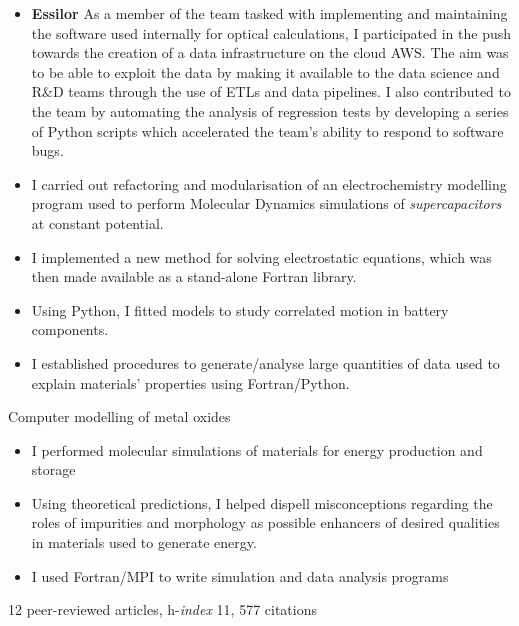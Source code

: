 \documentclass[10pt,a4paper,ragged2e,academicons]{altacv}
\begin{document}
\divider

\begin{itemize}
\item \textbf{Essilor} As a member of the team tasked with implementing and maintaining the software used internally for optical calculations, I participated in the push towards the creation of a data infrastructure on the cloud AWS. The aim was to be able to exploit the data by making it available to the data science and R\&D teams through the use of ETLs and data pipelines. I also contributed to the team by automating the analysis of regression tests by developing a series of Python scripts which accelerated the team's ability to respond to software bugs.
\end{itemize}

\divider

\begin{itemize}
\item I carried out refactoring and modularisation of an electrochemistry modelling program used to perform Molecular Dynamics simulations of \textit{supercapacitors} at constant potential.
\item I implemented a new method for solving electrostatic equations, which was then made available as a stand-alone Fortran library.  
\end{itemize}

\clearpage
{}

\begin{itemize}
\item Using Python, I fitted models to study correlated motion in
battery components.
\item I established procedures to generate/analyse large
quantities of data used to explain materials'
properties using Fortran/Python. 
\end{itemize}

\divider

Computer modelling of metal oxides
\smallskip
\begin{itemize}
\item I performed molecular simulations of materials for energy production and storage
\item Using theoretical predictions, I helped dispell
misconceptions regarding the roles of impurities
and morphology as possible enhancers of
desired qualities in materials used to generate
energy.
\item I used Fortran/MPI to write simulation and data analysis programs
\end{itemize}
{\small 12 peer-reviewed articles, h-\textit{index} 11, 577 citations}

\end{document}
